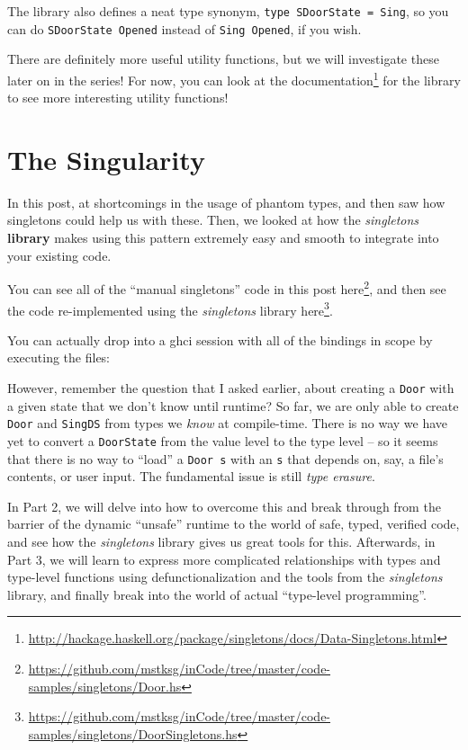 \documentclass[]{article}
\newenvironment{Shaded}{}{}
\newcommand{\ExtensionTok}[1]{#1}
\newcommand{\NormalTok}[1]{#1}
\renewcommand{\href}[2]{#2\footnote{\url{#1}}}
\begin{document}
The library also defines a neat type synonym,
\texttt{type\ SDoorState\ =\ Sing}, so you can do
\texttt{SDoorState\ \textquotesingle{}Opened} instead of
\texttt{Sing\ \textquotesingle{}Opened}, if you wish.

There are definitely more useful utility functions, but we will investigate
these later on in the series! For now, you can look at the
\href{http://hackage.haskell.org/package/singletons/docs/Data-Singletons.html}{documentation}
for the library to see more interesting utility functions!

\hypertarget{the-singularity}{%
\section{The Singularity}\label{the-singularity}}

In this post, at shortcomings in the usage of phantom types, and then saw how
singletons could help us with these. Then, we looked at how the
\emph{singletons} \textbf{library} makes using this pattern extremely easy and
smooth to integrate into your existing code.

You can see all of the ``manual singletons'' code in this post
\href{https://github.com/mstksg/inCode/tree/master/code-samples/singletons/Door.hs}{here},
and then see the code re-implemented using the \emph{singletons} library
\href{https://github.com/mstksg/inCode/tree/master/code-samples/singletons/DoorSingletons.hs}{here}.

You can actually drop into a ghci session with all of the bindings in scope by
executing the files:

\begin{Shaded}
\end{Shaded}

However, remember the question that I asked earlier, about creating a
\texttt{Door} with a given state that we don't know until runtime? So far, we
are only able to create \texttt{Door} and \texttt{SingDS} from types we
\emph{know} at compile-time. There is no way we have yet to convert a
\texttt{DoorState} from the value level to the type level -- so it seems that
there is no way to ``load'' a \texttt{Door\ s} with an \texttt{s} that depends
on, say, a file's contents, or user input. The fundamental issue is still
\emph{type erasure}.

In Part 2, we will delve into how to overcome this and break through from the
barrier of the dynamic ``unsafe'' runtime to the world of safe, typed, verified
code, and see how the \emph{singletons} library gives us great tools for this.
Afterwards, in Part 3, we will learn to express more complicated relationships
with types and type-level functions using defunctionalization and the tools from
the \emph{singletons} library, and finally break into the world of actual
``type-level programming''.
\end{document}
